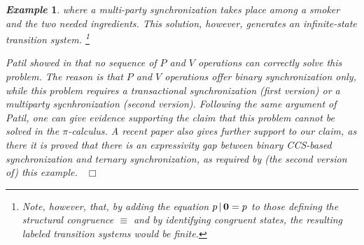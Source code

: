 \documentclass[submission,copyright,creativecommons]{eptcs}
\newcommand{\fine}{{\mbox{ }\nolinebreak\hfill{$\Box$}}}
\newcommand{\para}{\mbox{$\,|\,$}}
\newcommand{\nil}{\mbox{\bf 0}}
\newtheorem{aexample}{\it Example}
\newenvironment{example}{\begin{aexample} }{\end{aexample}}
\begin{document}
\begin{example}
where a multi-party synchronization takes place among a smoker and the two needed ingredients.
This solution, however, generates an infinite-state transition system. \footnote{Note, however, that,
by adding the equation $p \para \nil = p$
to those defining the structural congruence $\equiv$ and by identifying congruent states, the resulting
labeled transition systems would be finite.}

Patil showed in \cite{Pat71} that no sequence of $P$ and $V$ operations \cite{Dij68} can correctly solve this problem.
The reason is that $P$ and $V$ operations offer binary synchronization only, while this problem requires
a transactional synchronization (first version) or a multiparty sycnhronization (second version). 
Following the same argument of Patil, one can give evidence
supporting the claim that this problem cannot be solved in the $\pi$-calculus. A recent paper \cite{LV10} also 
gives further support to our claim, as there it is proved that there is an expressivity gap between binary 
CCS-based synchronization and ternary synchronization, as required by (the second version of) this example. 
\fine
\end{example}
\end{document}
